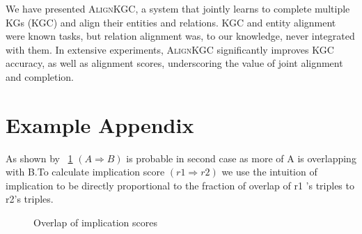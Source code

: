 \documentclass[11pt]{article}
\def\shortname{\textsc{Align\-KGC}}
\begin{document}
We have presented \shortname, a system that jointly learns to complete multiple KGs (KGC) and align their entities and relations.  KGC and entity alignment were known tasks, but relation alignment was, to our knowledge, never integrated with them.  In extensive experiments, \shortname{} significantly improves KGC accuracy, as well as alignment scores, underscoring the value of joint alignment and completion.






\iffalse

\appendix

\section{Example Appendix}
\label{sec:appendix}

As shown by \figurename~\ref{fig:VennDiagrams}  $(A \Rightarrow B)$ is probable in second case as more of A is overlapping with B.To calculate implication score $(r1 \Rightarrow r2)$ we use the intuition of  implication to be directly proportional to the fraction of overlap of r1 's triples to r2's triples.
   
\begin{figure}[h]   
\caption{Overlap of implication scores} 
\label{fig:VennDiagrams}
\end{figure}    
\end{document}
